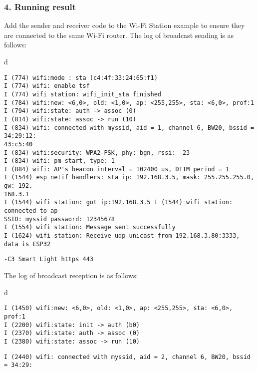 \documentclass[a4paper,12pt]{book}
\begin{document}
\subsubsection{4. Running result}
Add the sender and receiver code to the Wi-Fi Station example to ensure they are connected to the same Wi-Fi router. The log of broadcast sending is as follows: 

\begin{codebloc}
\begin{tabular}{d}
\vspace{2pt}
\begin{verbatim}
I (774) wifi:mode : sta (c4:4f:33:24:65:f1)
I (774) wifi: enable tsf
I (774) wifi station: wifi_init_sta finished
I (784) wifi:new: <6,0>, old: <1,0>, ap: <255,255>, sta: <6,0>, prof:1
I (794) wifi:state: auth -> assoc (0)
I (814) wifi:state: assoc -> run (10)
I (834) wifi: connected with myssid, aid = 1, channel 6, BW20, bssid = 34:29:12:
43:c5:40
I (834) wifi:security: WPA2-PSK, phy: bgn, rssi: -23
I (834) wifi: pm start, type: 1 
I (884) wifi: AP's beacon interval = 102400 us, DTIM period = 1 
I (1544) esp netif handlers: sta ip: 192.168.3.5, mask: 255.255.255.0, gw: 192.
168.3.1 
I (1544) wifi station: got ip:192.168.3.5 I (1544) wifi station: connected to ap 
SSID: myssid password: 12345678 
I (1554) wifi station: Message sent successfully
I (1624) wifi station: Receive udp unicast from 192.168.3.80:3333, data is ESP32
\end{verbatim}
\verb|-C3 Smart Light https 443|
\end{tabular}
\end{codebloc}

The log of broadcast reception is as follows:

\begin{codebloc}
\begin{tabular}{d}
\vspace{2pt}
\begin{verbatim}
I (1450) wifi:new: <6,0>, old: <1,0>, ap: <255,255>, sta: <6,0>, prof:1 
I (2200) wifi:state: init -> auth (b0)
I (2370) wifi:state: auth -> assoc (0) 
I (2380) wifi:state: assoc -> run (10) 
\end{verbatim}
\verb|I (2440) wifi: connected with myssid, aid = 2, channel 6, BW20, bssid = 34:29:|
\end{tabular}
\end{codebloc}
\end{document}
